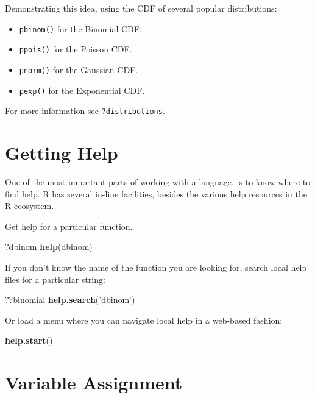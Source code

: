\documentclass[]{book}
\newenvironment{Shaded}{\begin{snugshade}}{\end{snugshade}}
\newcommand{\KeywordTok}[1]{\textcolor[rgb]{0.13,0.29,0.53}{\textbf{#1}}}
\newcommand{\StringTok}[1]{\textcolor[rgb]{0.31,0.60,0.02}{#1}}
\newcommand{\NormalTok}[1]{#1}
\providecommand{\tightlist}{%
  \setlength{\itemsep}{0pt}\setlength{\parskip}{0pt}}
\theoremstyle{definition}
\theoremstyle{definition}
\theoremstyle{definition}
\theoremstyle{remark}
\begin{document}
Demonstrating this idea, using the CDF of several popular distributions:

\begin{itemize}
\tightlist
\item
  \texttt{pbinom()} for the Binomial CDF.
\item
  \texttt{ppois()} for the Poisson CDF.
\item
  \texttt{pnorm()} for the Gaussian CDF.
\item
  \texttt{pexp()} for the Exponential CDF.
\end{itemize}

For more information see \texttt{?distributions}.

\section{Getting Help}\label{getting-help}

One of the most important parts of working with a language, is to know
where to find help. R has several in-line facilities, besides the
various help resources in the R
\protect\hyperlink{ecosystem}{ecosystem}.

Get help for a particular function.

\begin{Shaded}
\begin{Highlighting}[]
\NormalTok{?dbinom }
\KeywordTok{help}\NormalTok{(dbinom)}
\end{Highlighting}
\end{Shaded}

If you don't know the name of the function you are looking for, search
local help files for a particular string:

\begin{Shaded}
\begin{Highlighting}[]
\NormalTok{??binomial}
\KeywordTok{help.search}\NormalTok{(}\StringTok{'dbinom'}\NormalTok{) }
\end{Highlighting}
\end{Shaded}

Or load a menu where you can navigate local help in a web-based fashion:

\begin{Shaded}
\begin{Highlighting}[]
\KeywordTok{help.start}\NormalTok{() }
\end{Highlighting}
\end{Shaded}

\section{Variable Assignment}\label{variable-assignment}
\end{document}
